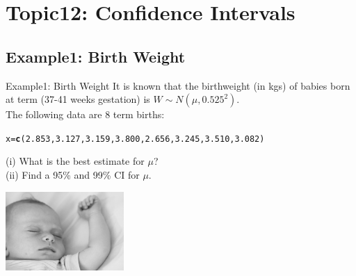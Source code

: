\documentclass[t,xcolor=pdftex,dvipsnames,table]{beamer}\usepackage[]{graphicx}\usepackage[]{color}
\makeatletter
\newcommand{\hlnum}[1]{\textcolor[rgb]{0.686,0.059,0.569}{#1}}%
\newcommand{\hlstd}[1]{\textcolor[rgb]{0.345,0.345,0.345}{#1}}%
\newcommand{\hlkwb}[1]{\textcolor[rgb]{0.69,0.353,0.396}{#1}}%
\newcommand{\hlkwd}[1]{\textcolor[rgb]{0.737,0.353,0.396}{\textbf{#1}}}%
\newenvironment{kframe}{%
 \def\at@end@of@kframe{}%
 \ifinner\ifhmode%
  \def\at@end@of@kframe{\end{minipage}}%
  \begin{minipage}{\columnwidth}%
 \fi\fi%
 \def\FrameCommand##1{\hskip\@totalleftmargin \hskip-\fboxsep
 \colorbox{shadecolor}{##1}\hskip-\fboxsep
     \hskip-\linewidth \hskip-\@totalleftmargin \hskip\columnwidth}%
 \MakeFramed {\advance\hsize-\width
   \@totalleftmargin\z@ \linewidth\hsize
   \@setminipage}}%
 {\par\unskip\endMakeFramed%
 \at@end@of@kframe}
\newenvironment{knitrout}{}{} %
\makeatother
\begin{document}
\section[12]{Topic12: Confidence Intervals}

\subsection[Examples]{Example1: Birth Weight}
\begin{frame}{Example1: Birth Weight}
It is known that the birthweight (in kgs) of babies born at term (37-41 weeks gestation) is $W \sim N(\mu,0.525^2)$. \\

The following data are 8 term births:

\begin{knitrout}
\color{fgcolor}\begin{kframe}
\begin{alltt}
\hlstd{x}\hlkwb{=}\hlkwd{c}\hlstd{(}\hlnum{2.853}\hlstd{,}\hlnum{3.127}\hlstd{,}\hlnum{3.159}\hlstd{,}\hlnum{3.800}\hlstd{,}\hlnum{2.656}\hlstd{,}\hlnum{3.245}\hlstd{,}\hlnum{3.510}\hlstd{,}\hlnum{3.082}\hlstd{)}
\end{alltt}
\end{kframe}
\end{knitrout}

\vspace{.5cm}
(i) What is the best estimate for $\mu$? \\

(ii) Find a 95\% and 99\% CI for $\mu$. \\

\begin{center}
\includegraphics[height=3cm]{../images/Baby.jpg}
\end{center}
\end{frame}
\end{document}
